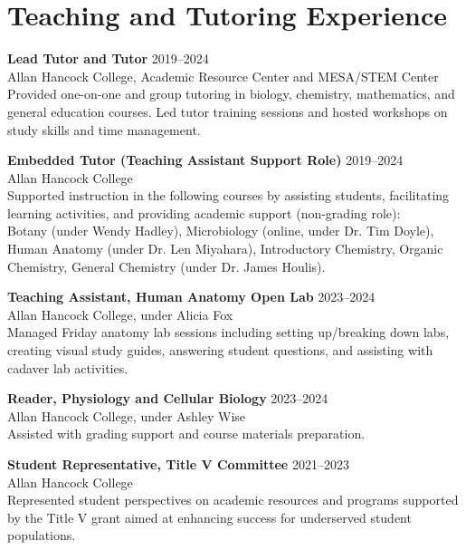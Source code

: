 \documentclass[letterpaper]{article}
\renewenvironment{itemize}{
  \begin{list}{}{
    \setlength{\leftmargin}{1.5em}
  }
}{
  \end{list}
}
\begin{document}
 \section*{Teaching and Tutoring Experience}

\begin{itemize}

  \item \textbf{Lead Tutor and Tutor} \hfill 2019--2024 \\
  Allan Hancock College, Academic Resource Center and MESA/STEM Center \\
  Provided one-on-one and group tutoring in biology, chemistry, mathematics, and general education courses. Led tutor training sessions and hosted workshops on study skills and time management.

  \item \textbf{Embedded Tutor (Teaching Assistant Support Role)} \hfill 2019--2024 \\
  Allan Hancock College \\
  Supported instruction in the following courses by assisting students, facilitating learning activities, and providing academic support (non-grading role): \\
  Botany (under Wendy Hadley), Microbiology (online, under Dr. Tim Doyle), Human Anatomy (under Dr. Len Miyahara), Introductory Chemistry, Organic Chemistry, General Chemistry (under Dr. James Houlis).

  \item \textbf{Teaching Assistant, Human Anatomy Open Lab} \hfill 2023--2024 \\
  Allan Hancock College, under Alicia Fox \\
  Managed Friday anatomy lab sessions including setting up/breaking down labs, creating visual study guides, answering student questions, and assisting with cadaver lab activities.

  \item \textbf{Reader, Physiology and Cellular Biology} \hfill 2023--2024 \\
  Allan Hancock College, under Ashley Wise \\
  Assisted with grading support and course materials preparation.

  \item \textbf{Student Representative, Title V Committee} \hfill 2021--2023 \\
  Allan Hancock College \\
  Represented student perspectives on academic resources and programs supported by the Title V grant aimed at enhancing success for underserved student populations.

\end{itemize}
\end{document}

